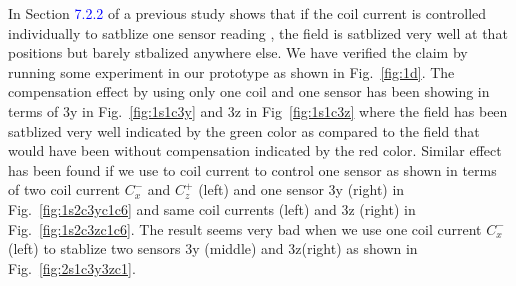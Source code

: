 In Section \textcolor{blue}{7.2.2} of a previous study \cite{bea} shows that if the coil current is controlled individually to satblize one sensor reading , the field is satblized very well at that positions but barely stbalized anywhere else. We have verified the claim by running some experiment in our prototype as shown in Fig.~\ref{fig:1d}. The compensation effect by using only one coil and one sensor has been showing in terms of 3y in Fig.~\ref{fig:1s1c3y} and 3z in Fig~\ref{fig:1s1c3z} where the field has been satblized very well indicated by the green color as compared to the field that would have been without compensation indicated by the red color. Similar effect has been found if we use to coil current to control one sensor as shown in terms of two coil current $C_x^-$ and $C_z^+$ (left) and one sensor 3y (right) in Fig.~\ref{fig:1s2c3yc1c6} and same coil currents (left) and 3z (right) in Fig.~\ref{fig:1s2c3zc1c6}. The result seems very bad when we use one coil current $C_x^-$ (left) to stablize two sensors 3y (middle) and 3z(right) as shown in Fig.~\ref{fig:2s1c3y3zc1}. 
